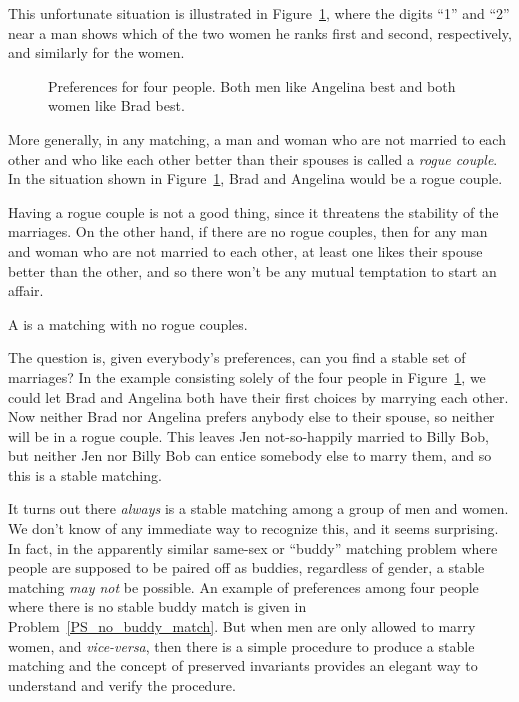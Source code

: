 This unfortunate situation is illustrated in
Figure~\ref{fig:minWtMatch2}, where the digits ``1'' and ``2'' near a
man shows which of the two women he ranks first and second,
respectively, and similarly for the women.

\begin{figure}


\caption{Preferences for four people.  Both men like Angelina best and
both women like Brad best.}
\label{fig:minWtMatch2}
\end{figure}

More generally, in any matching, a man and woman who are not married
to each other and who like each other better than their spouses is
called a \emph{rogue couple}.  In the situation shown in
Figure~\ref{fig:minWtMatch2}, Brad and Angelina would be a rogue
couple.

Having a rogue couple is not a good thing, since it threatens the
stability of the marriages.  On the other hand, if there are no rogue
couples, then for any man and woman who are not married to each other,
at least one likes their spouse better than the other, and so there
won't be any mutual temptation to start an affair.

\begin{definition}
  A  is a matching with no rogue couples.
\end{definition}

The question is, given everybody's preferences, can you find a stable
set of marriages?  In the example consisting solely of the four people
in Figure~\ref{fig:minWtMatch2}, we could let Brad and Angelina both
have their first choices by marrying each other.  Now neither Brad nor
Angelina prefers anybody else to their spouse, so neither will be in a
rogue couple.  This leaves Jen not-so-happily married to Billy Bob,
but neither Jen nor Billy Bob can entice somebody else to marry them,
and so this is a stable matching.

It turns out there \emph{always} is a stable matching among a group of
men and women.  We don't know of any immediate way to recognize this,
and it seems surprising.  In fact, in the apparently similar same-sex
or ``buddy'' matching problem where people are supposed to be paired
off as buddies, regardless of gender, a stable matching \emph{may not}
be possible.  An example of preferences among four people where there
is no stable buddy match is given in Problem~\ref{PS_no_buddy_match}.
But when men are only allowed to marry women, and \emph{vice-versa},
then there is a simple procedure to produce a stable matching and the
concept of preserved invariants provides an elegant way to understand
and verify the procedure.

